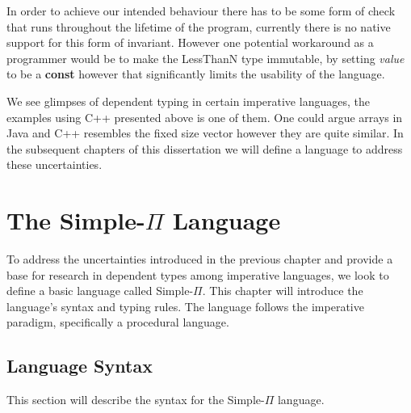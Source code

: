 \documentclass[a4paper,12pt]{report}
\begin{document}
\par
In order to achieve our intended behaviour there has to be some form of check 
that runs throughout the lifetime of the program, currently there is no native 
support for this form of invariant. However one potential workaround as a 
programmer would be to make the LessThanN type immutable, by setting \textit{value} 
to be a \textbf{const} however that significantly limits the usability of the 
language. 

\par
We see glimpses of dependent typing in certain imperative languages, the 
examples using C++ presented above is one of them. One could argue arrays in 
Java and C++ resembles the fixed size vector however they are quite similar. In 
the subsequent chapters of this dissertation we will define a language to 
address these uncertainties. 

\chapter{The Simple-$\Pi$ Language}
To address the uncertainties introduced in the previous chapter and provide a 
base for research in dependent types among imperative languages, we look to 
define a basic language called Simple-$\Pi$. This chapter will introduce 
the language's syntax and typing rules. The language follows 
the imperative paradigm, specifically a procedural language.

\section{Language Syntax}
This section will describe the syntax for the Simple-$\Pi$ language. 
\end{document}
